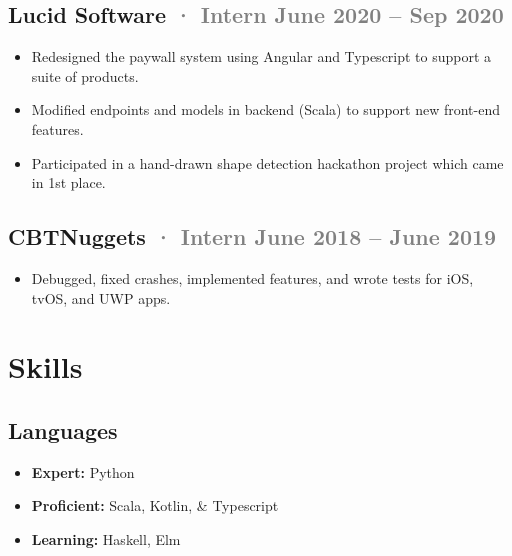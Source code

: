 \documentclass[12pt]{article} %
\providecommand{\tightlist}{%
  \setlength{\itemsep}{0pt}\setlength{\parskip}{0pt}}
\renewcommand{\emph}[1]{%
  \textcolor{gray}{#1}%
}
\begin{document}
\begin{paracol}{2}
\begin{raggedright}
\hypertarget{lucid-software-intern-june-2020-sep-2020}{%
\subsection{\texorpdfstring{Lucid Software \emph{· Intern \hfill June
2020 -- Sep
2020}}{Lucid Software · Intern June 2020 -- Sep 2020}}\label{lucid-software-intern-june-2020-sep-2020}}

\begin{itemize}
\tightlist
\item
  Redesigned the paywall system using Angular and Typescript to support
  a suite of products.
\item
  Modified endpoints and models in backend (Scala) to support new
  front-end features.
\item
  Participated in a hand-drawn shape detection hackathon project which
  came in 1st place.
\end{itemize}

\hypertarget{cbtnuggets-intern-june-2018-june-2019}{%
\subsection{\texorpdfstring{CBTNuggets \emph{· Intern \hfill June 2018
-- June
2019}}{CBTNuggets · Intern June 2018 -- June 2019}}\label{cbtnuggets-intern-june-2018-june-2019}}

\begin{itemize}
\tightlist
\item
  Debugged, fixed crashes, implemented features, and wrote tests for
  iOS, tvOS, and UWP apps.
\end{itemize}

\switchcolumn 

\hypertarget{skills}{%
\section{Skills}\label{skills}}

\hypertarget{languages}{%
\subsection{Languages}\label{languages}}

\begin{itemize}
\tightlist
\item
  \textbf{Expert:} Python
\item
  \textbf{Proficient:} Scala, Kotlin, \& Typescript
\item
  \textbf{Learning:} Haskell, Elm
\end{itemize}


\end{raggedright}
\end{paracol}
\end{document}
